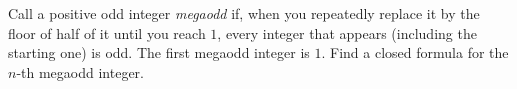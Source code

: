 Call a positive odd integer \emph{megaodd} if, when you repeatedly replace it by the floor of half of it until you reach $1$, every integer that appears (including the starting one) is odd. The first megaodd integer is $1$. Find a closed formula for the $n$-th megaodd integer.
